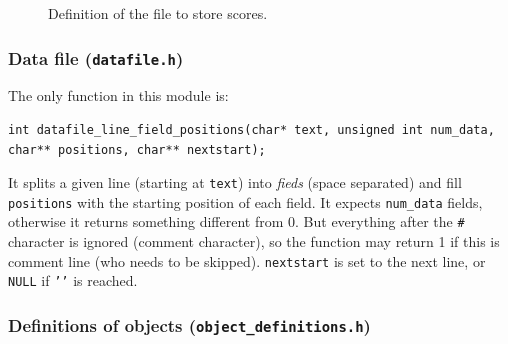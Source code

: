 \documentclass[12pt,a4paper]{article}
\newcommand{\cc}[1]{\texttt{#1}}
\begin{document}
\begin{figure}[!p]
	\centering
{}
\caption{Definition of the file to store scores.}
\label{fig:def:scores}
\end{figure} 

\subsubsection{Data file (\texttt{datafile.h})}

The only function in this module is:\begin{verbatim}
int datafile_line_field_positions(char* text, unsigned int num_data, char** positions, char** nextstart);
\end{verbatim}

It splits a given line (starting at \cc{text}) into \textit{fieds} (space separated) and fill \cc{positions} with the starting position of each field. It expects \cc{num_data} fields, otherwise it returns something different from 0. But everything after the \texttt{\#} character is ignored (comment character), so the function may return 1 if this is comment line (who needs to be skipped). \cc{nextstart} is set to the next line, or \cc{NULL} if \cc{'\0'} is reached.

\subsubsection{Definitions of objects (\texttt{object\_definitions.h})}
\end{document}
